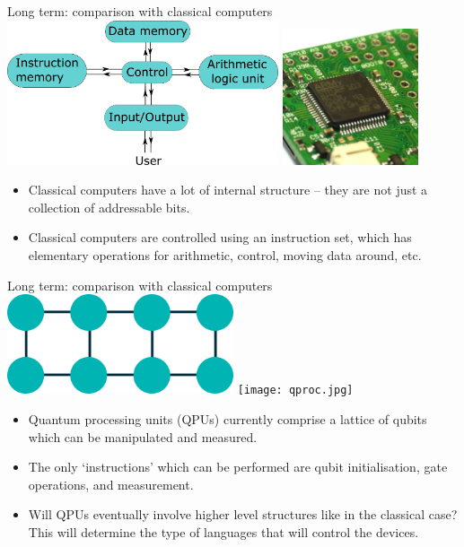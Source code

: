 \documentclass{beamer}
\begin{document}
\begin{frame}{Long term: comparison with classical computers}
  \includegraphics[width=0.6\textwidth]{Harvard_architecture.png}
  \hfill
  \includegraphics[width=0.3\textwidth]{micro.jpg} \cite{armchip}
  \begin{itemize}
  \item Classical computers have a lot of internal structure -- they are not just a collection of addressable bits.
  \item Classical computers are controlled using an instruction set, which has elementary operations for arithmetic, control, moving data around, etc.
  \end{itemize}
\end{frame}

\begin{frame}{Long term: comparison with classical computers}
  \includegraphics[width=0.5\textwidth]{nearestneighbourcon.png}
  \hfill
  \texttt{[image: qproc.jpg]} \cite{supercondpic}
  \begin{itemize}
  \item Quantum processing units (QPUs) currently comprise a lattice of qubits which can be manipulated and measured.
  \item The only `instructions' which can be performed are qubit initialisation, gate
      operations, and measurement.
  \item Will QPUs eventually involve higher level structures like in the classical case? This will determine the type of languages that will control the devices.
  \end{itemize}
\end{frame}
\end{document}
